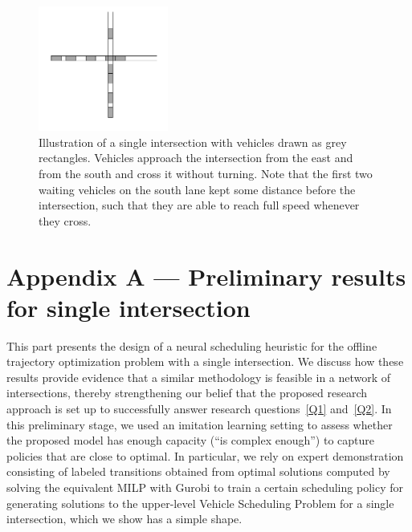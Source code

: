 \documentclass{article}
\theoremstyle{definition}
\theoremstyle{plain}
\begin{document}
\newpage



\newpage
{}

\appendix

\begin{figure}
  \centering
  \includegraphics[width=0.38\textwidth]{../figures/single_intersection_example.png}
  \caption{Illustration of a single intersection with vehicles drawn as grey
    rectangles. Vehicles approach the intersection from the east and from the
    south and cross it without turning. Note that the first two waiting vehicles
    on the south lane kept some distance before the intersection, such that they
    are able to reach full speed whenever they
    cross.}\label{fig:single_intersection}
\end{figure}

\section*{Appendix A --- Preliminary results for single intersection}

\renewcommand{\thesection}{A}

This part presents the design of a neural scheduling heuristic for the offline
trajectory optimization problem with a single intersection. We discuss how these
results provide evidence that a similar methodology is feasible in a network of
intersections, thereby strengthening our belief that the proposed research
approach is set up to successfully answer research questions~\ref{Q1}
and~\ref{Q2}.
%
In this preliminary stage, we used an imitation learning setting to assess
whether the proposed model has enough capacity (``is complex enough'') to
capture policies that are close to optimal. In particular, we rely on expert
demonstration consisting of labeled transitions obtained from optimal solutions
computed by solving the equivalent MILP with Gurobi to train a certain
scheduling policy for generating solutions to the upper-level Vehicle Scheduling
Problem for a single intersection, which we show has a simple shape.
\end{document}
